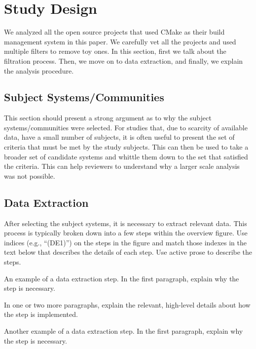 
\section{Study Design}
\label{sec:design}

We analyzed all the open source projects that used CMake as their build management system in this paper.
We carefully vet all the projects and used multiple filters to remove toy ones.
In this section, first we talk about the filtration process.
Then, we move on to data extraction, and finally, we explain the analysis procedure.

\subsection{Subject Systems/Communities}\label{subsec:subject-systems/communities}

This section should present a strong argument as to why the subject systems/communities were selected.
For studies that, due to scarcity of available data, have a small number of subjects, it is often useful to present the set of criteria that must be met by the study subjects.
This can then be used to take a broader set of candidate systems and whittle them down to the set that satisfied the criteria.
This can help reviewers to understand why a larger scale analysis was not possible.

\subsection{Data Extraction}

After selecting the subject systems, it is necessary to extract relevant data.
This process is typically broken down into a few steps within the overview figure.
Use indices (e.g., ``(DE1)'') on the steps in the figure and match those indexes in the text below that describes the details of each step.
Use active prose to describe the steps.

An example of a data extraction step.
In the first paragraph, explain why the step is necessary.

In one or two more paragraphs, explain the relevant, high-level details about how the step is implemented.

Another example of a data extraction step.
In the first paragraph, explain why the step is necessary.

